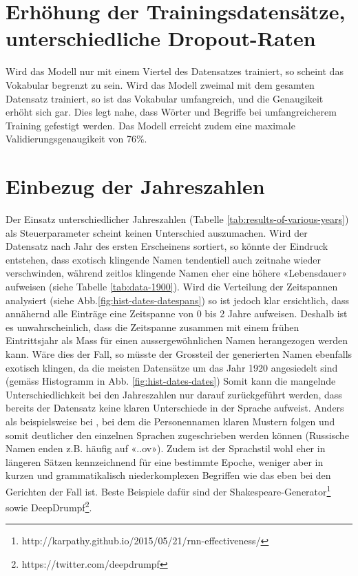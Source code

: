 \section{Erhöhung der Trainingsdatensätze, unterschiedliche Dropout-Raten}
\label{sec:increase-num-dataset}

Wird das Modell nur mit einem Viertel des Datensatzes trainiert, so scheint das Vokabular begrenzt zu sein.
Wird das Modell zweimal mit dem gesamten Datensatz trainiert, so ist das Vokabular umfangreich, und die Genaugikeit
erhöht sich gar.
Dies legt nahe, dass Wörter und Begriffe bei umfangreicherem Training gefestigt werden.
Das Modell erreicht zudem eine maximale Validierungsgenaugikeit von 76\%.



\section{Einbezug der Jahreszahlen}
\label{sec:including-years}

Der Einsatz unterschiedlicher Jahreszahlen (Tabelle \ref{tab:results-of-various-years}) als Steuerparameter scheint keinen Unterschied auszumachen.
Wird der Datensatz nach Jahr des ersten Erscheinens sortiert, so könnte der Eindruck entstehen,
dass exotisch klingende Namen tendentiell auch zeitnahe wieder verschwinden, während zeitlos klingende
Namen eher eine höhere «Lebensdauer» aufweisen (siehe Tabelle \ref{tab:data-1900}).
Wird die Verteilung der Zeitspannen analysiert (siehe Abb.\ref{fig:hist-dates-datespans}) so ist jedoch klar ersichtlich,
dass annähernd alle Einträge eine Zeitspanne von 0 bis 2 Jahre aufweisen.
Deshalb ist es unwahrscheinlich, dass die Zeitspanne zusammen mit einem frühen Eintrittsjahr als Mass für einen
aussergewöhnlichen Namen herangezogen werden kann.
Wäre dies der Fall, so müsste der Grossteil der generierten Namen ebenfalls exotisch klingen, da die meisten Datensätze
um das Jahr 1920 angesiedelt sind (gemäss Histogramm in Abb. \ref{fig:hist-dates-dates})
Somit kann die mangelnde Unterschiedlichkeit bei den Jahreszahlen nur darauf zurückgeführt werden, dass bereits
der Datensatz keine klaren Unterschiede in der Sprache aufweist.
Anders als beispielsweise bei \autocite{robertson}, bei dem die Personennamen klaren Mustern folgen und somit deutlicher
den einzelnen Sprachen zugeschrieben werden können (Russische Namen enden z.B. häufig auf «..ov»).
Zudem ist der Sprachstil wohl eher in längeren Sätzen kennzeichnend für eine bestimmte Epoche, weniger aber in kurzen und
grammatikalisch niederkomplexen Begriffen wie das eben bei den Gerichten der Fall ist.
Beste Beispiele dafür sind der Shakespeare-Generator\footnote{http://karpathy.github.io/2015/05/21/rnn-effectiveness/} sowie DeepDrumpf\footnote{https://twitter.com/deepdrumpf}.

